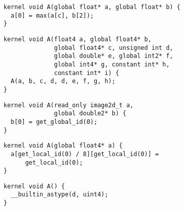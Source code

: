 \newsavebox{\OclgrindUncorrectedTypos}
\begin{lrbox}{\OclgrindUncorrectedTypos}
  \begin{minipage}{\textwidth}
    \begin{verbatim}
kernel void A(global float* a, global float* b) {
  a[0] = max(a[c], b[2]);
}
    \end{verbatim}
  \end{minipage}
\end{lrbox}

\newsavebox{\NvidiaRecursionSegfault}
\begin{lrbox}{\NvidiaRecursionSegfault}
  \begin{minipage}{\textwidth}
    \begin{verbatim}
kernel void A(float4 a, global float4* b,
              global float4* c, unsigned int d,
              global double* e, global int2* f,
              global int4* g, constant int* h,
              constant int* i) {
  A(a, b, c, d, d, e, f, g, h);
}
    \end{verbatim}
  \end{minipage}
\end{lrbox}

\newsavebox{\IntelGtDoubleAssertion}
\begin{lrbox}{\IntelGtDoubleAssertion}
  \begin{minipage}{\textwidth}
    \begin{verbatim}
kernel void A(read_only image2d_t a,
              global double2* b) {
  b[0] = get_global_id(0);
}
    \end{verbatim}
  \end{minipage}
\end{lrbox}

\newsavebox{\BeignetScalarizeInsert}
\begin{lrbox}{\BeignetScalarizeInsert}
  \begin{minipage}{\textwidth}
    \begin{verbatim}
kernel void A(global float4* a) {
  a[get_local_id(0) / 8][get_local_id(0)] =
      get_local_id(0);
}
    \end{verbatim}
  \end{minipage}
\end{lrbox}

\newsavebox{\AlmostEverythingCrash}
\begin{lrbox}{\AlmostEverythingCrash}
  \begin{minipage}{\textwidth}
    \begin{verbatim}
kernel void A() {
  __builtin_astype(d, uint4);
}
    \end{verbatim}
  \end{minipage}
\end{lrbox}
